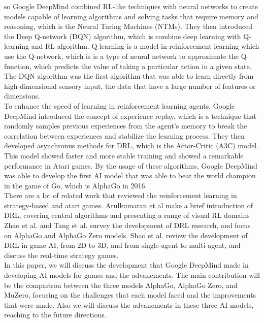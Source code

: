 so Google DeepMind combined RL-like techniques with neural networks to create models capable of 
learning algorithms and solving tasks that require memory and reasoning, which is the Neural Turing 
Machines (NTMs)\cite{I4}.
They then introduced the Deep Q-network (DQN) algorithm, which is combine deep learning 
with Q-learning and RL algorithm. Q-learning is a model in reinforcement learning which use 
the Q-network, which is is a type of neural network to approximate the Q-function, which predicts 
the value of taking a particular action in a given state\cite{I5}. The DQN algorithm was the first 
algorithm that was able to learn directly from high-dimensional sensory input, the data that have a 
large number of features or dimensions\cite{I6}.\\
To enhance the speed of learning in reinforcement learning agents, Google DeepMind introduced the 
concept of experience replay, which is a technique that randomly samples previous experiences from 
the agent's memory to break the correlation between experiences and stabilize the learning process\cite{I7}. 
They then developed asynchronus methods for DRL, which is the Actor-Critic (A3C) model. This model showed 
faster and more stable training and showed a remarkable performance in Atari games\cite{I8}. By the usage of 
these algorithms, Google DeepMind was able to develop the first AI model that was able to beat the world 
champion in the game of Go, which is AlphaGo in 2016.\\ 
There are a lot of related work that reviewed the reinforcement learning in strategy-based and atari games. 
Arulkumaran et al\cite{I9} make a brief introduction of DRL, covering central algorithms and presenting a 
range of visual RL domains Zhao et al.\cite{I10} and Tang et al.\cite{I11} survey the development of DRL 
research, and focus on AlphaGo and AlphaGo Zero models. Shao et al.\cite{I12} review the development of 
DRL in game AI, from 2D to 3D, and from single-agent to multi-agent, and discuss the real-time strategy games.\\
In this paper, we will discuss the development that Google DeepMind made in developing AI models for games and 
the advancments. The main contribution will be the comparison between the three models AlphaGo, AlphaGo Zero, 
and MuZero, focusing on the challenges that each model faced and the improvements that were made. Also we will 
discuss the advancments in these three AI models, reaching to the future directions.